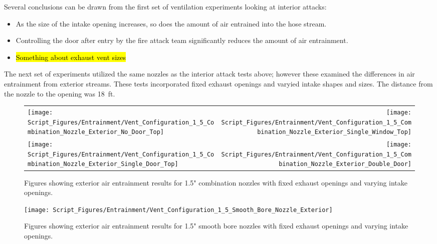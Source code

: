 \documentclass{article}
\begin{document}
Several conclusions can be drawn from the first set of ventilation experiments looking at interior attacks:

\begin{itemize}
	\item As the size of the intake opening increases, so does the amount of air entrained into the hose stream.
	\item Controlling the door after entry by the fire attack team significantly reduces the amount of air entrainment.
	\item \hl{Something about exhaust vent sizes}
\end{itemize}

\clearpage

The next set of experiments utilized the same nozzles as the interior attack tests above; however these examined the differences in air entrainment from exterior streams. These tests incorporated fixed exhaust openings and varyied intake shapes and sizes. The distance from the nozzle to the opening was 18~ft.

\begin{figure}[!ht]
\begin{tabular*}{\textwidth}{lr}
\texttt{[image: Script\_Figures/Entrainment/Vent\_Configuration\_1\_5\_Combination\_Nozzle\_Exterior\_No\_Door\_Top]} &
\texttt{[image: Script\_Figures/Entrainment/Vent\_Configuration\_1\_5\_Combination\_Nozzle\_Exterior\_Single\_Window\_Top]} \\
\texttt{[image: Script\_Figures/Entrainment/Vent\_Configuration\_1\_5\_Combination\_Nozzle\_Exterior\_Single\_Door\_Top]} &
\texttt{[image: Script\_Figures/Entrainment/Vent\_Configuration\_1\_5\_Combination\_Nozzle\_Exterior\_Double\_Door]} \\
\end{tabular*}
\caption{Figures showing exterior air entrainment results for 1.5" combination nozzles with fixed exhaust openings and varying intake openings.}
\label{fig:1_5_Exterior_Combination_Vents}
\end{figure}

\clearpage

\begin{figure}[!ht]
\centering
\texttt{[image: Script\_Figures/Entrainment/Vent\_Configuration\_1\_5\_Smooth\_Bore\_Nozzle\_Exterior]}
\caption{Figures showing exterior air entrainment results for 1.5" smooth bore nozzles with fixed exhaust openings and varying intake openings.}
\label{fig:1_5_Exterior_Smooth_Bore_Vents}
\end{figure}
\end{document}
